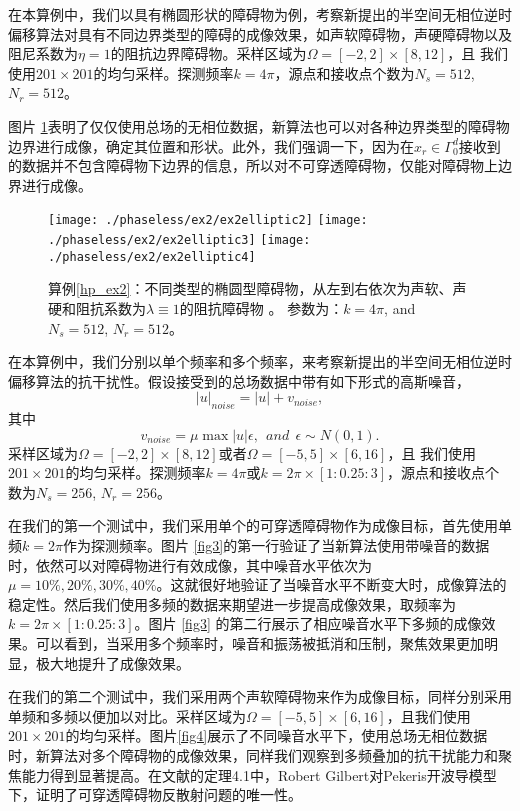 \begin{example}\label{hp_ex2}
在本算例中，我们以具有椭圆形状的障碍物为例，考察新提出的半空间无相位逆时偏移算法对具有不同边界类型的障碍的成像效果，如声软障碍物，声硬障碍物以及阻尼系数为$\eta=1$的阻抗边界障碍物。采样区域为$\Omega=[-2,2]\times[8,12]$，且
我们使用$201\times201$的均匀采样。探测频率$k=4\pi$，源点和接收点个数为$N_s=512$, $N_r=512$。

图片 \ref{fig2}表明了仅仅使用总场的无相位数据，新算法也可以对各种边界类型的障碍物边界进行成像，确定其位置和形状。此外，我们强调一下，因为在$x_r\in\Gamma_0^d$接收到的数据并不包含障碍物下边界的信息，所以对不可穿透障碍物，仅能对障碍物上边界进行成像。
\end{example}
\begin{figure}[h]
  \centering
  \texttt{[image: ./phaseless/ex2/ex2elliptic2]}
  \texttt{[image: ./phaseless/ex2/ex2elliptic3]}
  \texttt{[image: ./phaseless/ex2/ex2elliptic4]}
    \caption{算例\ref{hp_ex2}：不同类型的椭圆型障碍物，从左到右依次为声软、声硬和阻抗系数为$\lambda\equiv1$的阻抗障碍物 。 参数为：$k=4\pi$, and $N_s=512$, $N_r=512$。}\label{fig2}
\end{figure}
\begin{example}\label{hp_ex3}
在本算例中，我们分别以单个频率和多个频率，来考察新提出的半空间无相位逆时偏移算法的抗干扰性。假设接受到的总场数据中带有如下形式的高斯噪音，
$$ |u|_{noise}=|u|+v_{noise},$$
其中
$$v_{noise}=\mu \max{|u|}\epsilon,\ \ and\ \ \epsilon\sim N(0,1).$$
采样区域为$\Omega=[-2,2]\times[8,12]$或者$\Omega=[-5,5]\times[6,16]$，且
我们使用$201\times201$的均匀采样。探测频率$k=4\pi$或$k=2\pi\times[1:0.25:3]$，源点和接收点个数为$N_s=256$, $N_r=256$。

在我们的第一个测试中，我们采用单个的可穿透障碍物作为成像目标，首先使用单频$k=2\pi$作为探测频率。图片 \ref{fig3}的第一行验证了当新算法使用带噪音的数据时，依然可以对障碍物进行有效成像，其中噪音水平依次为$\mu = 10\%, 20\%, 30\%, 40\%$。这就很好地验证了当噪音水平不断变大时，成像算法的稳定性。然后我们使用多频的数据来期望进一步提高成像效果，取频率为$k=2\pi\times[1:0.25:3]$。图片 \ref{fig3} 的第二行展示了相应噪音水平下多频的成像效果。可以看到，当采用多个频率时，噪音和振荡被抵消和压制，聚焦效果更加明显，极大地提升了成像效果。

在我们的第二个测试中，我们采用两个声软障碍物来作为成像目标，同样分别采用单频和多频以便加以对比。采样区域为$\Omega=[-5,5]\times[6,16]$，且我们使用$201\times201$的均匀采样。图片\ref{fig4}展示了不同噪音水平下，使用总场无相位数据时，新算法对多个障碍物的成像效果，同样我们观察到多频叠加的抗干扰能力和聚焦能力得到显著提高。在文献\cite{Robert2007Inverse}的定理4.1中，Robert Gilbert对Pekeris开波导模型下，证明了可穿透障碍物反散射问题的唯一性。
\end{example}

